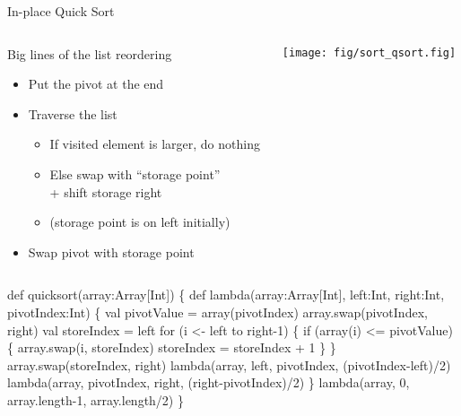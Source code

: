 \begin{frame}[fragile]{In-place Quick Sort}
  \null\vspace{-2.3\baselineskip}
  \begin{columns}
    \begin{column}{.6\linewidth}
      \begin{block}{Big lines of the list reordering}
        \begin{itemize}
        \item Put the pivot at the end
        \item Traverse the list
          \begin{itemize}
          \item If visited element is larger, do nothing
          \item Else swap with ``storage point'' \\
            + shift storage right
          \item[] (storage point is on left initially)
          \end{itemize}
        \item Swap pivot with storage point
        \end{itemize}
      \end{block}      
    \end{column}
    \begin{column}{.4\linewidth}
      \texttt{[image: fig/sort\_qsort.fig]}      
    \end{column}
  \end{columns}\vspace{-\baselineskip}

  \begin{center}
    \begin{boitecode}{}
def quicksort(array:Array[Int]) \{
  def lambda(array:Array[Int], left:Int, right:Int, pivotIndex:Int) \{
    val pivotValue = array(pivotIndex)
    array.swap(pivotIndex, right) 
    val storeIndex = left
    for (i <- left to right-1) \{
      if (array(i) <= pivotValue) \{
        array.swap(i, storeIndex)
        storeIndex = storeIndex + 1
    \} \}
    array.swap(storeIndex, right) 
    lambda(array, left, pivotIndex, (pivotIndex-left)/2)
    lambda(array, pivotIndex, right, (right-pivotIndex)/2)
  \}
  lambda(array, 0, array.length-1, array.length/2)
\}
  \end{boitecode}
 \end{center}
\end{frame}
